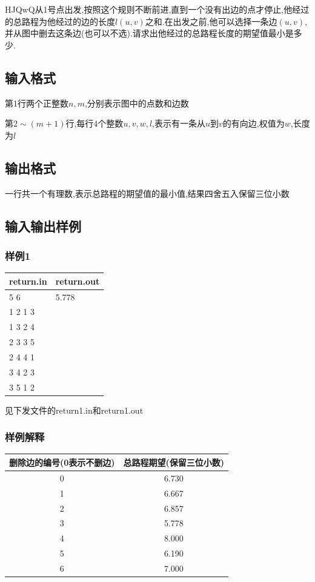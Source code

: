 \documentclass[12pt]{ctexart}
\begin{document}
	HJQwQ从1号点出发,按照这个规则不断前进,直到一个没有出边的点才停止,他经过的总路程为他经过的边的长度$l(u,v)$之和.在出发之前,他可以选择一条边$(u,v)$,并从图中删去这条边(也可以不选).请求出他经过的总路程长度的期望值最小是多少.
	\subsection{输入格式}
	第1行两个正整数$n,m$,分别表示图中的点数和边数

	第$2\sim(m+1)$行,每行4个整数$u,v,w,l$,表示有一条从$u$到$v$的有向边,权值为$w$,长度为$l$
	\subsection{输出格式}
	一行共一个有理数,表示总路程的期望值的最小值,结果四舍五入保留三位小数
	\subsection{输入输出样例}
	\subsubsection{样例1}
	\begin{center}
		\begin{tabular}{|p{6cm}|p{6cm}|}
			\hline return.in&return.out\\
			\hline	5 6&5.778\\
					1 2 1 3&\\
					1 3 2 4&\\
					2 3 3 5&\\
					2 4 4 1&\\
					3 4 2 3&\\
					3 5 1 2&\\
			\hline
		\end{tabular}
	\end{center}
	见下发文件的return1.in和return1.out
	\subsubsection{样例解释}
	\begin{center}
		\begin{tabular}{|c|c|}
			\hline 删除边的编号(0表示不删边)&总路程期望(保留三位小数)\\
			\hline 0&6.730\\
			\hline 1&6.667\\
			\hline 2&6.857\\
			\hline 3&5.778\\
			\hline 4&8.000\\
			\hline 5&6.190\\
			\hline 6&7.000\\
			\hline
		\end{tabular}
	\end{center}
\end{document}
